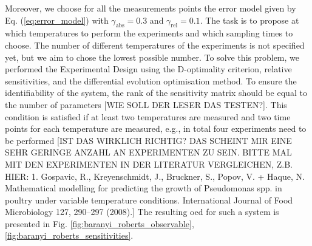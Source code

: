 \documentclass[10pt,A4paper]{article}
\begin{document}
Moreover, we choose for all the measurements points the error model given by Eq. (\ref{eq:error_model}) with $\gamma_\text{abs}=0.3$ and $\gamma_\text{rel}=0.1$.
The task is to propose at which temperatures to perform the experiments and which sampling times to choose.
The number of different temperatures of the experiments is not specified yet, but we aim to chose the lowest possible number.
To solve this problem, we performed the Experimental Design using the D-optimality criterion, relative sensitivities, and the differential evolution optimisation method.
To ensure the identifiability of the system, the rank of the sensitivity matrix should be equal to the number of parameters [WIE SOLL DER LESER DAS TESTEN?].
This condition is satisfied if at least two temperatures are measured and two time points for each temperature are measured, e.g., in total four experiments need to be performed 
[IST DAS WIRKLICH RICHTIG? DAS SCHEINT MIR EINE SEHR GERINGE ANZAHL AN EXPERIMENTEN ZU SEIN. BITTE MAL MIT DEN EXPERIMENTEN IN DER LITERATUR VERGLEICHEN, Z.B. HIER: 1. Gospavic, R., Kreyenschmidt, J., Bruckner, S., Popov, V. + Haque, N. Mathematical modelling for predicting the growth of Pseudomonas spp. in poultry under variable temperature conditions. International Journal of Food Microbiology 127, 290–297 (2008).]
The resulting \ac{oed} for such a system is presented in Fig. \ref{fig:baranyi_roberts_observable}, \ref{fig:baranyi_roberts_sensitivities}.
\end{document}
